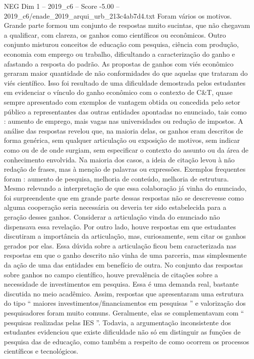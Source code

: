 \begin{textsample}{NEG Dim 1 – 2019\_c6 – Score -5.00 – 2019\_c6/enade\_2019\_arqui\_urb\_213c4ab7d4.txt}
Foram vários os motivos.
Grande parte formou um conjunto de respostas muito sucintas, que não chegavam a qualificar, com clareza, os ganhos como científicos ou econômicos.
Outro conjunto misturou conceitos de educação com pesquisa, ciência com produção, economia com emprego ou trabalho, dificultando a caracterização do ganho e afastando a resposta do padrão.
As propostas de ganhos com viés econômico geraram maior quantidade de não conformidades do que aquelas que trataram do viés científico.
Isso foi resultado de uma dificuldade demostrada pelos estudantes em evidenciar o vínculo do ganho econômico com o contexto de C\&T, quase sempre apresentado com exemplos de vantagem obtida ou concedida pelo setor público a representantes das outras entidades apontadas no enunciado, tais como : aumento de emprego, mais vagas nas universidades ou redução de impostos.
A análise das respostas revelou que, na maioria delas, os ganhos eram descritos de forma genérica, sem qualquer articulação ou exposição de motivos, sem indicar como ou de de onde surgiam, sem especificar o contexto do assunto ou da área de conhecimento envolvida.
Na maioria dos casos, a ideia de citação levou à não redação de frases, mas à menção de palavras ou expressões.
Exemplos frequentes foram : aumento de pesquisa, melhoria de conteúdo, melhoria de estrutura.
Mesmo relevando a interpretação de que essa colaboração já vinha do enunciado, foi surpreendente que em grande parte dessas respostas não se descrevesse como alguma cooperação seria necessária ou deveria ter sido estabelecida para a geração desses ganhos.
Considerar a articulação vinda do enunciado não dispensava essa revelação.
Por outro lado, houve respostas em que estudantes discutiram a importância da articulação, mas, curiosamente, sem citar os ganhos gerados por elas.
Essa dúvida sobre a articulação ficou bem caracterizada nas respostas em que o ganho descrito não vinha de uma parceria, mas simplesmente da ação de uma das entidades em benefício de outra.
No conjunto das respostas sobre ganhos no campo científico, houve prevalência de citações sobre a necessidade de investimentos em pesquisa.
Essa é uma demanda real, bastante discutida no meio acadêmico.
Assim, respostas que apresentaram uma estrutura do tipo “ maiores investimentos/financiamentos em pesquisas ” e valorização dos pesquisadores foram muito comuns.
Geralmente, elas se complementavam com “ pesquisas realizadas pelas IES ”.
Todavia, a argumentação inconsistente dos estudantes evidenciou que existe dificuldade não só em distinguir as funções de pesquisa das de educação, como também a respeito de como ocorrem os processos científicos e tecnológicos.

\end{textsample}
